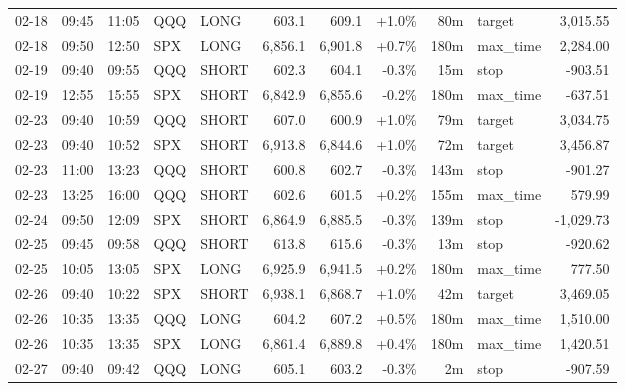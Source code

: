 \documentclass[11pt,a4paper,twoside]{article}
\begin{document}
\begin{center}
\begin{longtable}{>{\color{txtmain}}l l l l l r r r r >{\color{txtmain}}l r}
02-18 & 09:45 & 11:05 & QQQ & LONG & 603.1 & 609.1 & \textcolor{wingreen}{+1.0\%} & 80m & target & \textcolor{wingreen}{3,015.55} \\
02-18 & 09:50 & 12:50 & SPX & LONG & 6,856.1 & 6,901.8 & \textcolor{wingreen}{+0.7\%} & 180m & max\_time & \textcolor{wingreen}{2,284.00} \\
02-19 & 09:40 & 09:55 & QQQ & SHORT & 602.3 & 604.1 & \textcolor{lossred}{-0.3\%} & 15m & stop & \textcolor{lossred}{-903.51} \\
02-19 & 12:55 & 15:55 & SPX & SHORT & 6,842.9 & 6,855.6 & \textcolor{lossred}{-0.2\%} & 180m & max\_time & \textcolor{lossred}{-637.51} \\
02-23 & 09:40 & 10:59 & QQQ & SHORT & 607.0 & 600.9 & \textcolor{wingreen}{+1.0\%} & 79m & target & \textcolor{wingreen}{3,034.75} \\
02-23 & 09:40 & 10:52 & SPX & SHORT & 6,913.8 & 6,844.6 & \textcolor{wingreen}{+1.0\%} & 72m & target & \textcolor{wingreen}{3,456.87} \\
02-23 & 11:00 & 13:23 & QQQ & SHORT & 600.8 & 602.7 & \textcolor{lossred}{-0.3\%} & 143m & stop & \textcolor{lossred}{-901.27} \\
02-23 & 13:25 & 16:00 & QQQ & SHORT & 602.6 & 601.5 & \textcolor{wingreen}{+0.2\%} & 155m & max\_time & \textcolor{wingreen}{579.99} \\
02-24 & 09:50 & 12:09 & SPX & SHORT & 6,864.9 & 6,885.5 & \textcolor{lossred}{-0.3\%} & 139m & stop & \textcolor{lossred}{-1,029.73} \\
02-25 & 09:45 & 09:58 & QQQ & SHORT & 613.8 & 615.6 & \textcolor{lossred}{-0.3\%} & 13m & stop & \textcolor{lossred}{-920.62} \\
02-25 & 10:05 & 13:05 & SPX & LONG & 6,925.9 & 6,941.5 & \textcolor{wingreen}{+0.2\%} & 180m & max\_time & \textcolor{wingreen}{777.50} \\
02-26 & 09:40 & 10:22 & SPX & SHORT & 6,938.1 & 6,868.7 & \textcolor{wingreen}{+1.0\%} & 42m & target & \textcolor{wingreen}{3,469.05} \\
02-26 & 10:35 & 13:35 & QQQ & LONG & 604.2 & 607.2 & \textcolor{wingreen}{+0.5\%} & 180m & max\_time & \textcolor{wingreen}{1,510.00} \\
02-26 & 10:35 & 13:35 & SPX & LONG & 6,861.4 & 6,889.8 & \textcolor{wingreen}{+0.4\%} & 180m & max\_time & \textcolor{wingreen}{1,420.51} \\
02-27 & 09:40 & 09:42 & QQQ & LONG & 605.1 & 603.2 & \textcolor{lossred}{-0.3\%} & 2m & stop & \textcolor{lossred}{-907.59} \\

\end{longtable}
\end{center}
\end{document}
